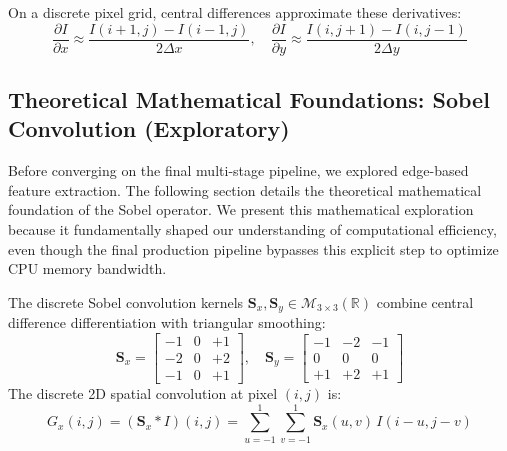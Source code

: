 On a discrete pixel grid, central differences approximate these derivatives:
\begin{equation}
    \frac{\partial I}{\partial x} \approx \frac{I(i+1, j) - I(i-1, j)}{2\Delta x}, \quad \frac{\partial I}{\partial y} \approx \frac{I(i, j+1) - I(i, j-1)}{2\Delta y}
\end{equation}

\subsection{Theoretical Mathematical Foundations: Sobel Convolution (Exploratory)}
Before converging on the final multi-stage pipeline, we explored edge-based feature extraction. The following section details the theoretical mathematical foundation of the Sobel operator. We present this mathematical exploration because it fundamentally shaped our understanding of computational efficiency, even though the final production pipeline bypasses this explicit step to optimize CPU memory bandwidth.

The discrete Sobel convolution kernels $\mathbf{S}_x, \mathbf{S}_y \in \mathcal{M}_{3 \times 3}(\mathbb{R})$ combine central difference differentiation with triangular smoothing:
\begin{equation}
    \mathbf{S}_x = \begin{bmatrix} -1 & 0 & +1 \\ -2 & 0 & +2 \\ -1 & 0 & +1 \end{bmatrix}, \quad \mathbf{S}_y = \begin{bmatrix} -1 & -2 & -1 \\ 0 & 0 & 0 \\ +1 & +2 & +1 \end{bmatrix}
\end{equation}
The discrete 2D spatial convolution at pixel $(i, j)$ is:
\begin{equation}
    G_x(i, j) = (\mathbf{S}_x * I)(i, j) = \sum_{u=-1}^{1} \sum_{v=-1}^{1} \mathbf{S}_x(u, v) \, I(i-u, j-v)
\end{equation}

